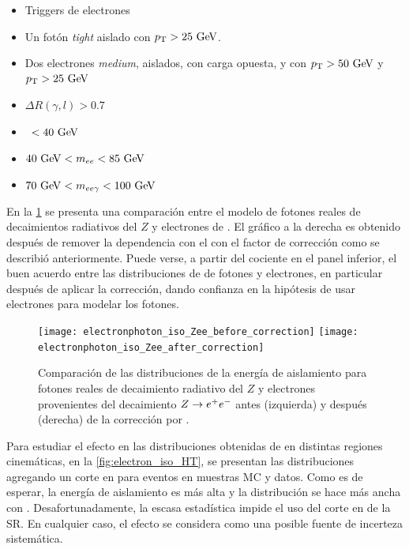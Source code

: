 \begin{itemize}\itemsep0.1cm
\item Triggers de electrones %
\item Un fotón \emph{tight} aislado con $\pt>25 \gev$.
\item Dos electrones \emph{medium}, aislados, con carga opuesta, y con $\pt>50 \gev$ y $\pt>25 \gev$
\item $\Delta R(\gamma,l)>0.7$
\item \MET\ $<40\gev$
\item $40\gev<m_{ee}<85\gev$
\item $70\gev<m_{ee\gamma}<100\gev$
\end{itemize}

En la \cref{fig:photon_electron_iso} se presenta una comparación entre el modelo
de fotones reales de decaimientos radiativos del $Z$ y electrones de {\Zee}. El
gráfico a la derecha es obtenido después de remover la dependencia con el {\pt}
con el factor de corrección como se describió anteriormente. Puede verse, a partir
del cociente en el panel inferior,
el buen acuerdo entre las distribuciones de {\etiso} de fotones y
electrones, en particular después de aplicar la corrección, dando confianza en la
hipótesis de usar electrones para modelar los fotones.


\begin{figure}[!htb]
  \centering

  \texttt{[image: electronphoton\_iso\_Zee\_before\_correction]}
  \texttt{[image: electronphoton\_iso\_Zee\_after\_correction]}

  \caption{Comparación de las distribuciones de la energía de aislamiento para fotones reales de
    decaimiento radiativo del $Z$ y electrones provenientes del decaimiento $Z \rightarrow e^+ e^-$ antes (izquierda)
    y después (derecha) de la corrección por \pt.}
    \label{fig:photon_electron_iso}

\end{figure}

Para estudiar el efecto en las distribuciones obtenidas de {\Zee} en distintas
regiones cinemáticas, en la \cref{fig:electron_iso_HT}, se presentan las
distribuciones agregando un corte en {\HT} para eventos {\Zee} en muestras MC y
datos. Como es de esperar, la energía de aislamiento es más alta y la
distribución se hace más ancha con \HT. Desafortunadamente, la escasa
estadística impide el uso del corte en {\HT} de la SR. En cualquier caso, el
efecto se considera como una posible fuente de incerteza sistemática.

